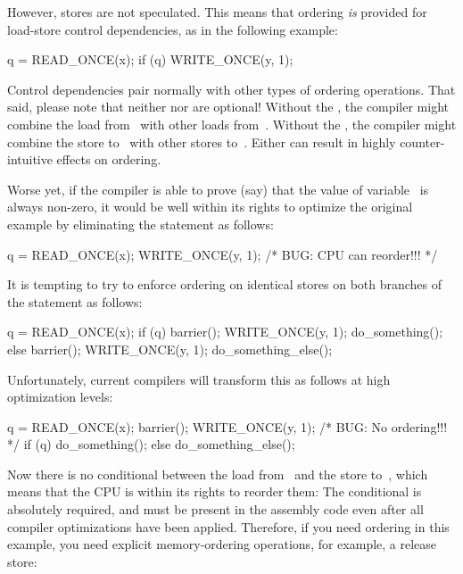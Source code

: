 However, stores are not speculated.
This means that ordering \emph{is} provided for load-store control
dependencies, as in the following example:

\begin{VerbatimN}
q = READ_ONCE(x);
if (q)
	WRITE_ONCE(y, 1);
\end{VerbatimN}

Control dependencies pair normally with other types of ordering operations.
That said, please note that neither  nor 
are optional!
Without the , the compiler might combine the load
from~ with other loads from~.
Without the , the compiler might combine the store
to~ with other stores to~.
Either can result in highly counter-intuitive effects on ordering.

Worse yet, if the compiler is able to prove (say) that the value of
variable~ is always non-zero, it would be well within its rights
to optimize the original example by eliminating the  statement
as follows:

\begin{VerbatimN}
q = READ_ONCE(x);
WRITE_ONCE(y, 1); /* BUG: CPU can reorder!!! */
\end{VerbatimN}

It is tempting to try to enforce ordering on identical stores on both
branches of the  statement as follows:

\begin{VerbatimN}
q = READ_ONCE(x);
if (q) {
	barrier();
	WRITE_ONCE(y, 1);
	do_something();
} else {
	barrier();
	WRITE_ONCE(y, 1);
	do_something_else();
}
\end{VerbatimN}

Unfortunately, current compilers will transform this as follows at high
optimization levels:

\begin{VerbatimN}
q = READ_ONCE(x);
barrier();
WRITE_ONCE(y, 1);  /* BUG: No ordering!!! */
if (q) {
	do_something();
} else {
	do_something_else();
}
\end{VerbatimN}

Now there is no conditional between the load from~ and the store
to~, which means that the CPU is within its rights to reorder them:
The conditional is absolutely required, and must be present in the
assembly code even after all compiler optimizations have been applied.
Therefore, if you need ordering in this example, you need explicit
memory-ordering operations, for example, a release store:

